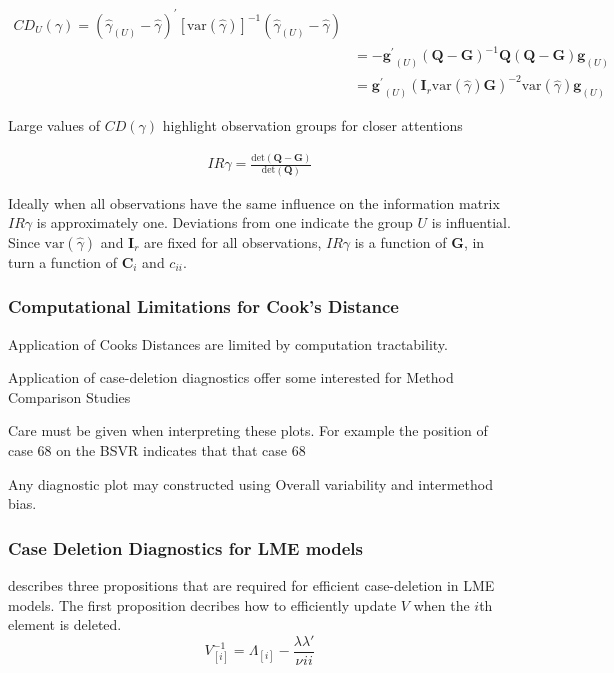\documentclass[12pt, a4paper]{report}
\theoremstyle{plain}
\theoremstyle{definition}
\theoremstyle{remark}
\begin{document}
	\begin{eqnarray*}
		CD_{U}(\gamma) = (\hat{\gamma}_{(U)} - \hat{\gamma})^{\prime}[\mbox{var}(\hat{\gamma})]^{-1}(\hat{\gamma}_{(U)} - \hat{\gamma})\\
		&= -\boldsymbol{g^{\prime}}_{(U)} (\boldsymbol{Q}-\boldsymbol{G})^{-1}\boldsymbol{Q}(\boldsymbol{Q}-\boldsymbol{G})\boldsymbol{g}_{(U)} \\
		&= \boldsymbol{g^{\prime}}_{(U)} (\boldsymbol{I}_{r}  \mbox{var}(\hat{\gamma})\boldsymbol{G})^{-2}\mbox{var}(\hat{\gamma})\boldsymbol{g}_{(U)}
	\end{eqnarray*}
	
	Large values of $CD(\gamma)$ highlight observation groups for closer attentions
	

	\begin{eqnarray*}
		IR{\gamma}  = \frac{\mbox{det}(\boldsymbol{Q} - \boldsymbol{G})}{\mbox{det}(\boldsymbol{Q})}
	\end{eqnarray*}
	
	Ideally when all observations have the same influence on the information matrix $IR{\gamma}$ is approximately one.
	Deviations from one indicate the group $U$ is influential. Since $\mbox{var}(\hat{\gamma})$ and $\boldsymbol{I}_{r}$ are fixed for all observations, $IR{\gamma}$ is a function of $\boldsymbol{G}$, in turn a function of $\boldsymbol{C}_{i}$ and $c_{ii}$.


	\subsubsection{Computational Limitations for Cook's Distance}
	Application of Cooks Distances are limited by computation tractability.
	
	
	Application of case-deletion diagnostics offer some interested for Method Comparison Studies
	
	
	Care must be given when interpreting these plots. For example the position of case 68 on the BSVR indicates that that
	case 68
	

	
	Any diagnostic plot may constructed using Overall variability and intermethod bias.
	

	\subsubsection{Case Deletion Diagnostics for LME models}
	
	
	
	\citet{Christensen} describes three propositions that are required
	for efficient case-deletion in LME models. The first proposition
	decribes how to efficiently update $V$ when the $i$th element is
	deleted.
	\begin{equation}
	V_{[i]}^{-1} = \Lambda_{[i]} - \frac{\lambda
		\lambda\prime}{\nu^{}ii}
	\end{equation}
	
\end{document}
